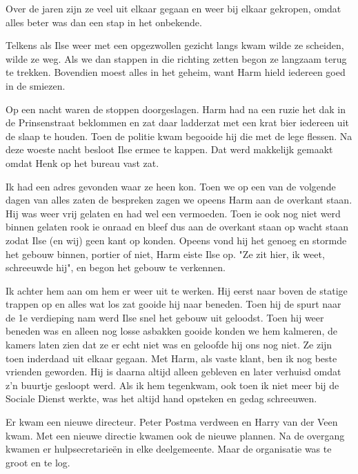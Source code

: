 \documentclass[10pt,twoside, openright]{memoir}
\begin{document}
Over de jaren zijn ze veel uit elkaar gegaan en weer bij elkaar gekropen, omdat alles beter was dan een stap in het onbekende. 

Telkens als Ilse weer met een opgezwollen gezicht langs kwam wilde ze scheiden, wilde ze weg. Als we dan stappen in die richting zetten begon ze langzaam terug te trekken. Bovendien moest alles in het geheim, want Harm hield iedereen goed in de smiezen. 

Op een nacht waren de stoppen doorgeslagen. Harm had na een ruzie het dak in de Prinsenstraat beklommen en zat daar ladderzat met een krat bier iedereen uit de slaap te houden. Toen de politie kwam begooide hij die met de lege flessen. Na deze woeste nacht besloot Ilse ermee te kappen. Dat werd makkelijk gemaakt omdat Henk op het bureau vast zat. 

Ik had een adres gevonden waar ze heen kon. Toen we op een van de volgende dagen van alles zaten de bespreken zagen we opeens Harm aan de overkant staan. Hij was weer vrij gelaten en had wel een vermoeden. Toen ie ook nog niet werd binnen gelaten rook ie onraad en bleef dus aan de overkant staan op wacht staan zodat Ilse (en wij) geen kant op konden. Opeens vond hij het genoeg en stormde het gebouw binnen, portier of niet, Harm eiste Ilse op. "Ze zit hier, ik weet, schreeuwde hij", en begon het gebouw te verkennen. 

Ik achter hem aan om hem er weer uit te werken. Hij eerst naar boven de statige trappen op en alles wat los zat gooide hij naar beneden. Toen hij de spurt naar de 1e verdieping nam werd Ilse snel het gebouw uit geloodst. Toen hij weer beneden was en alleen nog losse asbakken gooide konden we hem kalmeren, de kamers laten zien dat ze er echt niet was en geloofde hij ons nog niet. Ze zijn toen inderdaad uit elkaar gegaan. Met Harm, als vaste klant, ben ik nog beste vrienden geworden. Hij is daarna altijd alleen gebleven en later verhuisd omdat z’n buurtje gesloopt werd. Als ik hem tegenkwam, ook toen ik niet meer bij de Sociale Dienst werkte, was het altijd hand opsteken en gedag schreeuwen.

Er kwam een nieuwe directeur. Peter Postma verdween en Harry van der Veen kwam. Met een nieuwe directie kwamen ook de nieuwe plannen. Na de overgang kwamen er hulpsecretarieën in elke deelgemeente. Maar de organisatie was te groot en te log. 
\end{document}
